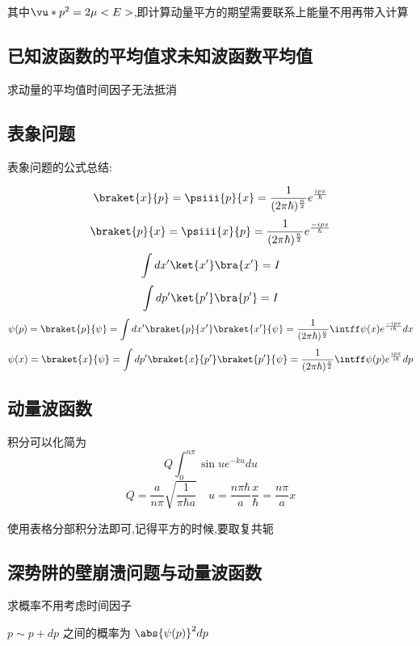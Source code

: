             其中$\vu*{p}^{2} = 2\mu<E>$,即计算动量平方的期望需要联系上能量不用再带入计算

        \subsection{已知波函数的平均值求未知波函数平均值}
            求动量的平均值时间因子无法抵消
        
        \subsection{表象问题}

            \begin{formal}

                表象问题的公式总结:

                $$ \braket{x}{p} = \psiii{p}{x} = \frac{1}{(2 \pi \hbar)^{\frac{n}{2}}} e^{\frac{ipx}{\hbar}} $$ 
                $$ \braket{p}{x} = \psiii{x}{p} = \frac{1}{(2 \pi \hbar)^{\frac{n}{2}}} e^{\frac{-ipx}{\hbar}} $$ 
                $$ \int dx' \ket{x'} \bra{x'} = I $$ 
                $$ \int dp' \ket{p'} \bra{p'} = I $$ 
                $$ \psi(p) = \braket{p}{\psi} = \int dx' \braket{p}{x'} \braket{x'}{\psi} = \frac{1}{(2 \pi \hbar)^{\frac{n}{2}}} \intff \psi(x) e^{\frac{-ipx}{i\hbar}} dx $$
                $$ \psi(x) = \braket{x}{\psi} = \int dp' \braket{x}{p'} \braket{p'}{\psi} = \frac{1}{(2 \pi \hbar)^{\frac{n}{2}}} \intff \psi(p) e^{\frac{ipx}{i\hbar}}  dp $$
            \end{formal}
                

        \subsection{动量波函数}
            积分可以化简为
            $$ Q \int_{0}^{n \pi} \sin{u} e^{-ku} du $$
            $$ Q = \frac{a}{n\pi} \sqrt{\frac{1}{\pi \hbar a}} \quad u = \frac{n \pi \hbar}{a} \frac{x}{\hbar}  = \frac{n \pi}{a} x $$
            
            使用表格分部积分法即可,记得平方的时候,要取复共轭
           


        \subsection{深势阱的壁崩溃问题与动量波函数}
            求概率不用考虑时间因子
            
            $ p \sim p+dp $ 之间的概率为 $ \abs{\psi(p)}^{2} dp $      

